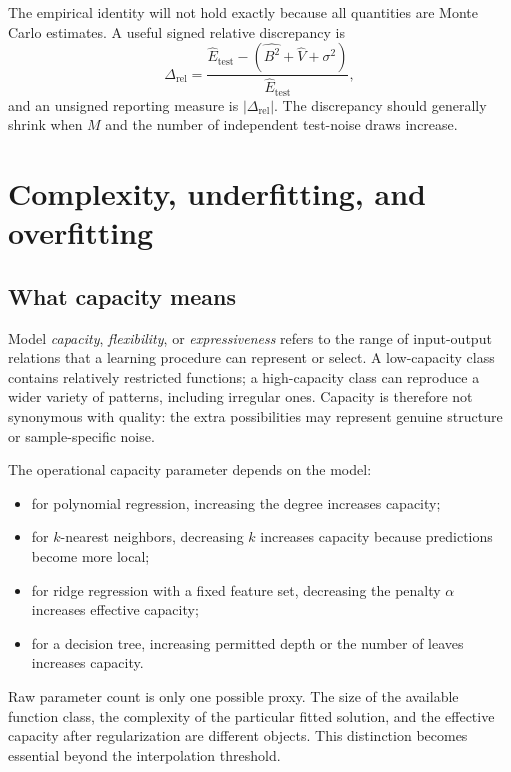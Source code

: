 \documentclass[11pt,a4paper]{article}
\begin{document}
The empirical identity will not hold exactly because all quantities are Monte Carlo estimates. A useful signed relative discrepancy is
\begin{equation}
  \Delta_{\mathrm{rel}}
  =\frac{\widehat E_{\mathrm{test}}-
    (\widehat{B^2}+\widehat V+\sigma^2)}
    {\widehat E_{\mathrm{test}}},
\end{equation}
and an unsigned reporting measure is $|\Delta_{\mathrm{rel}}|$. The discrepancy should generally shrink when $M$ and the number of independent test-noise draws increase.

\section{Complexity, underfitting, and overfitting}
\label{sec:complexity}

\subsection{What capacity means}

Model \emph{capacity}, \emph{flexibility}, or \emph{expressiveness} refers to the range of input-output relations that a learning procedure can represent or select. A low-capacity class contains relatively restricted functions; a high-capacity class can reproduce a wider variety of patterns, including irregular ones. Capacity is therefore not synonymous with quality: the extra possibilities may represent genuine structure or sample-specific noise.

The operational capacity parameter depends on the model:
\begin{itemize}
  \item for polynomial regression, increasing the degree increases capacity;
  \item for $k$-nearest neighbors, decreasing $k$ increases capacity because predictions become more local;
  \item for ridge regression with a fixed feature set, decreasing the penalty $\alpha$ increases effective capacity;
  \item for a decision tree, increasing permitted depth or the number of leaves increases capacity.
\end{itemize}
Raw parameter count is only one possible proxy. The size of the available function class, the complexity of the particular fitted solution, and the effective capacity after regularization are different objects. This distinction becomes essential beyond the interpolation threshold.
\end{document}
